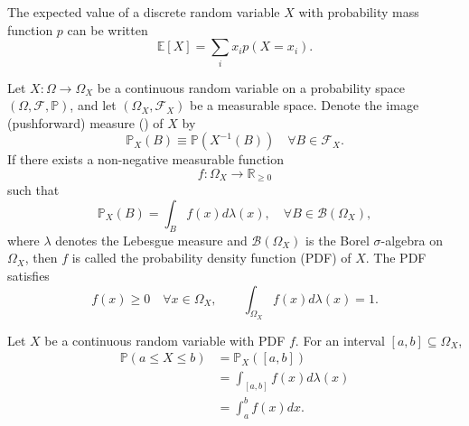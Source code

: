 \begin{theorem}
	The expected value of a discrete random variable $X$ with probability mass function $p$ can be written
	\begin{equation}
		\mathbb{E}[X]=\sum_{i}x_ip(X = x_i).
	\end{equation}
\end{theorem}

\begin{definition}
	\label{def:pdf}
	Let $X: \Omega \to \Omega_X$ be a continuous random variable on a probability space $(\Omega, \mathcal{F}, \mathbb{P})$, and let $(\Omega_X, \mathcal{F}_X)$ be a measurable space. Denote the image (pushforward) measure () of $X$ by
	\begin{equation}
		\mathbb{P}_X(B) \equiv \mathbb{P}(X^{-1}(B)) \quad \forall B \in \mathcal{F}_X.
	\end{equation}
	If there exists a non-negative measurable function
	\begin{equation}
		f: \Omega_X \to \mathbb{R}_{\ge 0}
	\end{equation} 
	such that
	\begin{equation}
		\mathbb{P}_X(B) = \int_B f(x) d\lambda(x), \quad \forall B \in \mathcal{B}(\Omega_X),
	\end{equation}
	where $\lambda$ denotes the Lebesgue measure and $\mathcal{B}(\Omega_X)$ is the Borel $\sigma$-algebra on $\Omega_X$, then $f$ is called the probability density function (PDF) of $X$. The PDF satisfies
	\begin{equation}
		f(x) \ge 0 \quad \forall x \in \Omega_X, 
		\qquad 
		\int_{\Omega_X} f(x) d\lambda(x) = 1.
	\end{equation}
\end{definition}

\begin{example}
	Let $X$ be a continuous random variable with PDF $f$. For an interval $[a,b] \subseteq \Omega_X$,
	\begin{equation}
		\begin{split}
			\mathbb{P}(a \le X \le b) 
			&= \mathbb{P}_X([a,b])\\ 
			&= \int_{[a,b]} f(x) d\lambda(x)\\ 
			&= \int_a^b f(x) dx.
		\end{split}
	\end{equation}
\end{example}

